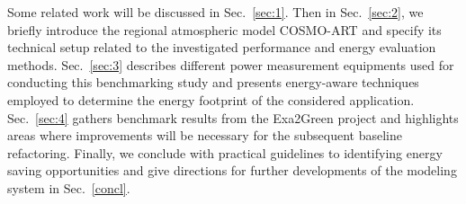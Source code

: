 Some  related work  will  be discussed  in  Sec.~\ref{sec:1}. Then  in
Sec.~\ref{sec:2}, we briefly  introduce the regional atmospheric model
COSMO-ART and specify its  technical setup related to the investigated
performance and energy evaluation methods.  Sec.~\ref{sec:3} describes
different  power  measurement  equipments  used  for  conducting  this
benchmarking  study and presents  energy-aware techniques  employed to
determine  the   energy  footprint  of   the  considered  application.
Sec.~\ref{sec:4} gathers benchmark  results from the Exa2Green project
and  highlights areas  where improvements  will be  necessary  for the
subsequent baseline refactoring.   Finally, we conclude with practical
guidelines  to  identifying   energy  saving  opportunities  and  give
directions  for  further  developments   of  the  modeling  system  in
Sec.~\ref{concl}.
